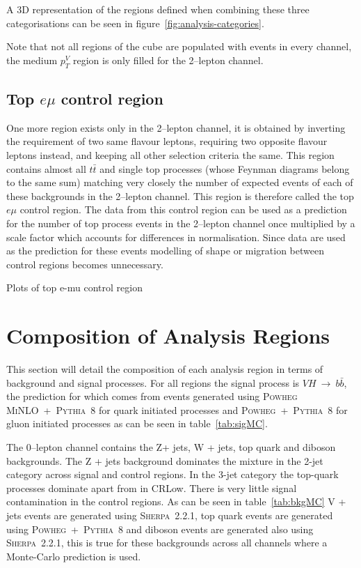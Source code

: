 A 3D representation of the regions defined when combining these three
categorisations can be seen in figure~\ref{fig:analysis-categories}.

Note that not all regions of the cube are populated with events in every channel, the medium
$p_T^V$ region is only filled for the 2--lepton channel.

\subsection{Top \texorpdfstring{$e \mu$}{e mu} control region}%
\label{sec:topemucr}

One more region exists only in the 2--lepton channel, it is obtained by inverting the
requirement of two same flavour leptons, requiring two opposite flavour leptons
instead, and keeping all other selection criteria the same. This region contains
almost all $t\bar{t}$ and single top processes (whose Feynman diagrams belong to
the same sum) matching very closely the number of expected events of each of
these backgrounds in the 2--lepton channel. This region is therefore called the
top $e \mu$ control region. The data from this control region can be used as a
prediction for the number of top process events in the 2--lepton channel once
multiplied by a scale factor which accounts for differences in normalisation.
Since data are used as the prediction for these events modelling of shape or
migration between control regions becomes unnecessary.

Plots of top e-mu control region

\section{Composition of Analysis Regions}
\label{sec:composition}

This section will detail the composition of each analysis region in terms of
background and signal processes. For all regions the signal process is
$VH~\rightarrow~b\bar{b}$, the prediction for which comes from events generated
using \textsc{Powheg MiNLO}~+~\textsc{Pythia~8} for quark initiated processes
and \textsc{Powheg}~+~\textsc{Pythia~8} for gluon initiated processes as can be
seen in table~\ref{tab:sigMC}.


The 0--lepton channel contains the  Z+ jets, W + jets, top quark and diboson
backgrounds. The Z + jets background dominates the mixture in the 2-jet category
across signal and control regions. In the 3-jet category the top-quark processes
dominate apart from in CRLow. There is very little signal contamination in the
control regions. As can be seen in table~\ref{tab:bkgMC} V + jets events are
generated using \textsc{Sherpa~2.2.1}, top quark events are generated using
\textsc{Powheg}~+~\textsc{Pythia~8} and diboson events are generated also using
\textsc{Sherpa~2.2.1}, this is true for these backgrounds across all channels
where a Monte-Carlo prediction is used.


